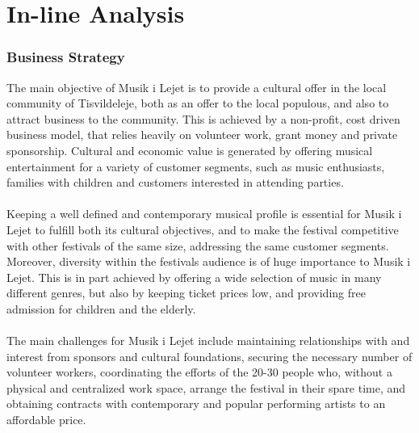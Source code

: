 \part{In-line Analysis}

\section{Business Strategy}
The main objective of Musik i Lejet is to provide a cultural offer in the local community of Tisvildeleje, both as an offer to the local populous, and also to attract business to the community. This is achieved by a non-profit, cost driven business model, that relies heavily on volunteer work, grant money and private sponsorship. Cultural and economic value is generated by offering musical entertainment for a variety of customer segments, such as music enthusiasts, families with children and customers interested in attending parties.
\\ \\
Keeping a well defined and contemporary musical profile is essential for Musik i Lejet to fulfill both its cultural objectives, and to make the festival competitive with other festivals of the same size, addressing the same customer segments. Moreover, diversity within the festivals audience is of huge importance to Musik i Lejet. This is in part achieved by offering a wide selection of music in many different genres, but also by keeping ticket prices low, and providing free admission for children and the elderly.
\\ \\
The main challenges for Musik i Lejet include maintaining relationships with and interest from sponsors and cultural foundations, securing the necessary number of volunteer workers, coordinating the efforts of the 20-30 people who, without a physical and centralized work space, arrange the festival in their spare time, and obtaining contracts with contemporary and popular performing artists to an affordable price.

